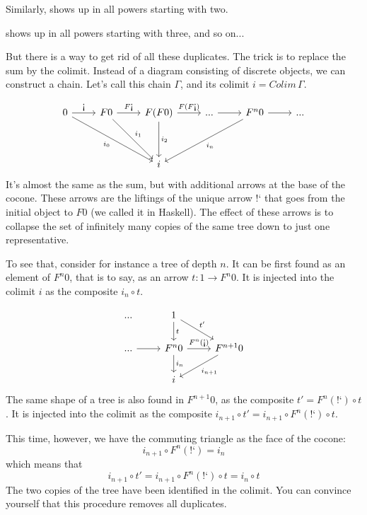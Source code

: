 \documentclass[DaoFP]{subfiles}
\begin{document}
Similarly,  shows up in all powers starting with two.

 shows up in all powers starting with three, and so on...

But there is a way to get rid of all these duplicates. The trick is to replace the sum by the colimit. Instead of a diagram consisting of discrete objects, we can construct a chain. Let's call this chain $\Gamma$, and its colimit $i = Colim \, \Gamma$.

\[
 \begin{tikzcd}
 0
 \arrow[r, "\mbox{!`}"]
 \arrow[ddrr, "i_0"']
 & F 0
  \arrow[r, "F\mbox{!`}"]
 \arrow[ddr, "i_1"]
& F (F 0)
  \arrow[r, "F(F\mbox{!`})"]
  \arrow[dd, "i_2"]
 & ...
 \arrow[r]
 & F^n 0
  \arrow[r]
 \arrow[ddll, "i_n"]
 & ...
 \\
 \\
 &&i
  \end{tikzcd}
\]
It's almost the same as the sum, but with additional arrows at the base of the cocone. These arrows are the liftings of the unique arrow $\mbox{!`}$ that goes from the initial object to $F 0$ (we called it  in Haskell). The effect of these arrows is to collapse the set of infinitely many copies of the same tree down to just one representative. 

To see that, consider for instance a tree of depth $n$. It can be first found as an element of $F^n 0$, that is to say, as an arrow $t \colon 1 \to F^n 0$. It is injected into the colimit $i$ as the composite $i_n \circ t$. 

\[
 \begin{tikzcd}
 ...
& 1
\arrow[d, "t"]
\arrow[dr, "t'"]
 \\
 ...
 \arrow[r]
 & F^n 0 
 \arrow[r, "F^n (\mbox{!`})"]
 \arrow[d, "i_n"]
 & F^{n+1} 0
 \arrow[dl, "i_{n+1}"]
 \\
 &  i
  \end{tikzcd}
\]
The same shape of a tree is also found in $F^{n+1} 0$, as the composite $t' = F^n (\mbox{!`}) \circ t$. It is injected into the colimit as the composite $i_{n+1} \circ t' = i_{n+1} \circ F^n (\mbox{!`}) \circ t$. 

This time, however, we have the commuting triangle as the face of the cocone:
\[i_{n+1} \circ F^n (\mbox{!`}) = i_n \]
which means that 
\[ i_{n+1} \circ t' =  i_{n+1} \circ F^n (\mbox{!`}) \circ t =  i_n \circ t\]
The two copies of the tree have been identified in the colimit. You can convince yourself that this procedure removes all duplicates.
\end{document}
